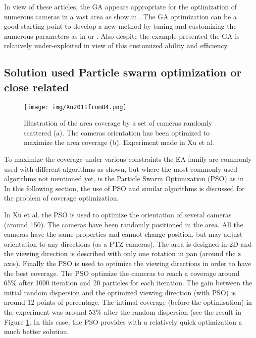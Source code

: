 In view of these articles, the GA appears appropriate for the optimization of numerous cameras in  a vast area as show in \cite{165*jiang2010}. The GA optimization can be a good starting point to develop a new method by tuning and customizing the numerous parameters as in \cite{101*topcuoglu2009,152*wang2009}  or \cite{83*van2009}. Also despite the example presented  the GA is relatively under-exploited in view of this customized ability and efficiency.


\subsection{Solution used Particle swarm optimization or close related}	

\begin{figure}[t!]
	\center
{}
   \texttt{[image: img/Xu2011from84.png]}
  \caption{Illustration of  the  area coverage by a set of cameras randomly scattered (a). The cameras orientation has been optimized to maximize the  area coverage (b). Experiment made in Xu et al. \citep{84*xu2011}}\label{fig:Coverage84}
  \endminipage\hfill
\end{figure} 

To maximize the coverage under various constraints the EA family are commonly used with different algorithms as shown, but where the most commonly used algorithms not mentioned yet, is the Particle Swarm Optimization (PSO) as in \cite{84*xu2011,8*zhou2011,33*reddy2012,143*maji2015,193*fu2014,194*fu2010,200*kulkarni2011}. In this following section, the use of PSO and similar algorithms is discussed for the problem of coverage optimization. 

 In Xu et al. \cite{84*xu2011} the PSO is used to optimize the orientation of several cameras (around 150).
The cameras have been randomly positioned in the area. All the cameras have the same properties and cannot change position, but may adjust orientation to any directions (as a PTZ cameras). The area is designed in 2D and the viewing direction is described with only one rotation in pan (around  the z axis).  
Finally the PSO is used to optimize the viewing directions in order to have the best coverage. The PSO optimize the cameras to reach a coverage around 65\% after 1000 iteration and 20 particles for each iteration.
The gain between the initial random dispersion  and the optimized viewing direction (with PSO) is  around 12 points of percentage. The intimal coverage (before the optimisation) in the experiment was around 53\% after the random dispersion (see the result in Figure \ref{fig:Coverage84}. In this case, the PSO provides with a relatively quick optimization a much better solution.

